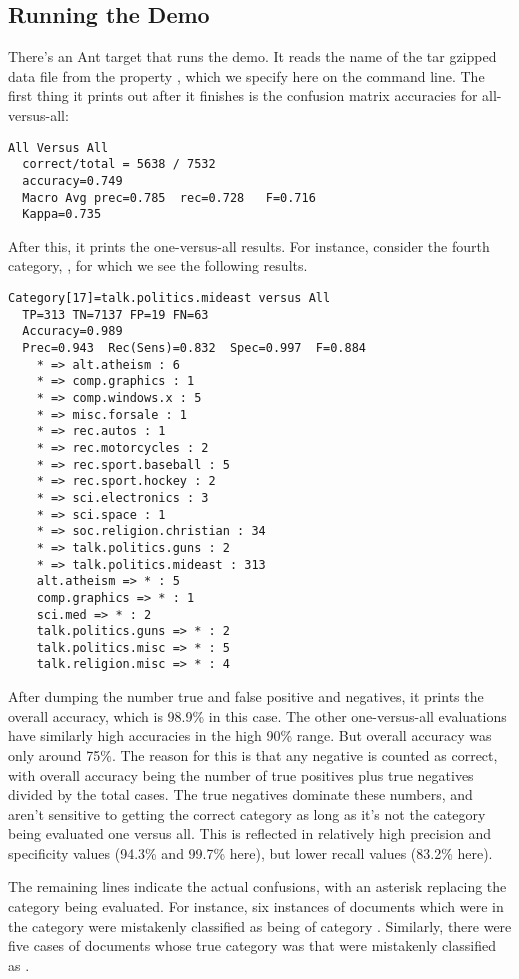 \subsection{Running the Demo}

There's an Ant target  that runs the demo.
It reads the name of the tar gzipped data file from
the property , which we specify here
on the command line.
%
%
The first thing it prints out after it finishes is the confusion
matrix accuracies for all-versus-all:
%
\begin{verbatim}
All Versus All
  correct/total = 5638 / 7532
  accuracy=0.749
  Macro Avg prec=0.785  rec=0.728   F=0.716
  Kappa=0.735
\end{verbatim}
%
After this, it prints the one-versus-all results.  For instance,
consider the fourth category, ,
for which we see the following results.
%
\begin{verbatim}
Category[17]=talk.politics.mideast versus All
  TP=313 TN=7137 FP=19 FN=63
  Accuracy=0.989
  Prec=0.943  Rec(Sens)=0.832  Spec=0.997  F=0.884
    * => alt.atheism : 6
    * => comp.graphics : 1
    * => comp.windows.x : 5
    * => misc.forsale : 1
    * => rec.autos : 1
    * => rec.motorcycles : 2
    * => rec.sport.baseball : 5
    * => rec.sport.hockey : 2
    * => sci.electronics : 3
    * => sci.space : 1
    * => soc.religion.christian : 34
    * => talk.politics.guns : 2
    * => talk.politics.mideast : 313
    alt.atheism => * : 5
    comp.graphics => * : 1
    sci.med => * : 2
    talk.politics.guns => * : 2
    talk.politics.misc => * : 5
    talk.religion.misc => * : 4
\end{verbatim}
%
After dumping the number true and false positive and negatives, it
prints the overall accuracy, which is 98.9\% in this case.  The other
one-versus-all evaluations have similarly high accuracies in the high
90\% range.  But overall accuracy was only around 75\%.  The reason
for this is that any negative is counted as correct, with overall
accuracy being the number of true positives plus true negatives
divided by the total cases.  The true negatives dominate these
numbers, and aren't sensitive to getting the correct category as long
as it's not the category being evaluated one versus all.  This is
reflected in relatively high precision and specificity values (94.3\%
and 99.7\% here), but lower recall values (83.2\% here).

The remaining lines indicate the actual confusions, with an asterisk
replacing the category being evaluated.  For instance, six instances
of documents which were in the 
category were mistakenly classified as being of category
.  Similarly, there were five cases of
documents whose true category was  that were mistakenly
classified as .









